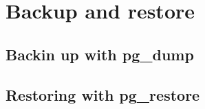 \chapter{Backup and restore}
\section{Backin up with pg\_dump}
\section{Restoring with pg\_restore}
